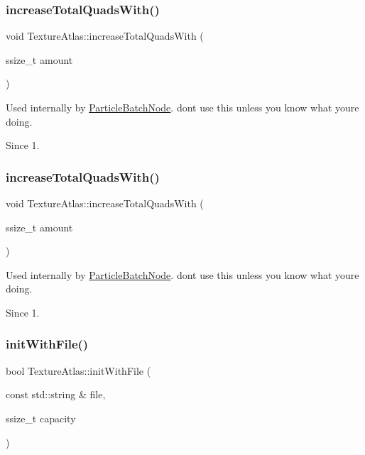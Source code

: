 \subsubsection{\texorpdfstring{increase\+Total\+Quads\+With()}{increaseTotalQuadsWith()}\hspace{0.1cm}{\footnotesize\ttfamily [1/2]}}
{\footnotesize\ttfamily void Texture\+Atlas\+::increase\+Total\+Quads\+With (\begin{DoxyParamCaption}\item[{ssize\+\_\+t}]{amount }\end{DoxyParamCaption})}

Used internally by \hyperlink{classParticleBatchNode}{Particle\+Batch\+Node}. don\textquotesingle{}t use this unless you know what you\textquotesingle{}re doing. \begin{DoxySince}{Since}
1. 
\end{DoxySince}
\mbox{\label{classTextureAtlas_a69818ba2fc5488effec077ff3a3a506c}} 
\subsubsection{\texorpdfstring{increase\+Total\+Quads\+With()}{increaseTotalQuadsWith()}\hspace{0.1cm}{\footnotesize\ttfamily [2/2]}}
{\footnotesize\ttfamily void Texture\+Atlas\+::increase\+Total\+Quads\+With (\begin{DoxyParamCaption}\item[{ssize\+\_\+t}]{amount }\end{DoxyParamCaption})}

Used internally by \hyperlink{classParticleBatchNode}{Particle\+Batch\+Node}. don\textquotesingle{}t use this unless you know what you\textquotesingle{}re doing. \begin{DoxySince}{Since}
1. 
\end{DoxySince}
\mbox{\label{classTextureAtlas_a325b82009a3ae2ec31ac42374eed1ab6}} 
\subsubsection{\texorpdfstring{init\+With\+File()}{initWithFile()}\hspace{0.1cm}{\footnotesize\ttfamily [1/2]}}
{\footnotesize\ttfamily bool Texture\+Atlas\+::init\+With\+File (\begin{DoxyParamCaption}\item[{const std\+::string \&}]{file,  }\item[{ssize\+\_\+t}]{capacity }\end{DoxyParamCaption})}

